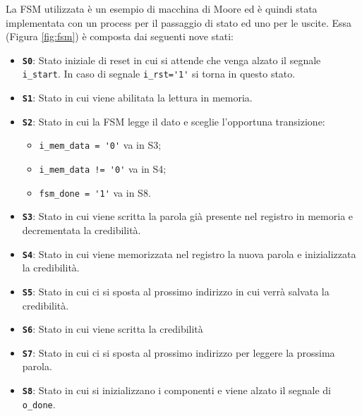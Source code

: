 La FSM utilizzata è un esempio di macchina di Moore ed è quindi stata implementata con un process per il passaggio di stato ed uno per le uscite.
Essa (Figura \ref{fig:fsm}) è composta dai seguenti nove stati:

\begin{itemize}[itemsep=10pt]
	\item \texttt{\textbf{S0}}:\newline
	Stato iniziale di reset in cui si attende che venga alzato il segnale \lstinline[columns=fixed]{i_start}. In caso di segnale \lstinline[columns=fixed]{i_rst='1'} si torna in questo stato.
 	\item \texttt{\textbf{S1}}:\newline
	Stato in cui viene abilitata la lettura in memoria.
 	\item \texttt{\textbf{S2}}:\newline
	Stato in cui la FSM legge il dato e sceglie l'opportuna transizione:
        \begin{itemize}
        	\item \lstinline[columns=fixed]{i_mem_data = '0'} va in S3;
        	\item \lstinline[columns=fixed]{i_mem_data != '0'} va in S4;
        	\item \lstinline[columns=fixed]{fsm_done = '1'} va in S8.
        \end{itemize}
 	\item \texttt{\textbf{S3}}:\newline
	Stato in cui viene scritta la parola già presente nel registro in memoria e decrementata la credibilità.
 	\item \texttt{\textbf{S4}}:\newline
	Stato in cui viene memorizzata nel registro la nuova parola e inizializzata la credibilità.
 	\item \texttt{\textbf{S5}}:\newline
	Stato in cui ci si sposta al prossimo indirizzo in cui verrà salvata la credibilità.
 	\item \texttt{\textbf{S6}}:\newline
	Stato in cui viene scritta la credibilità
	\item \texttt{\textbf{S7}}:\newline
	Stato in cui ci si sposta al prossimo indirizzo per leggere la prossima parola.
 	\item \texttt{\textbf{S8}}:\newline
	Stato in cui si inizializzano i componenti e viene alzato il segnale di \lstinline[columns=fixed]{o_done}.
\end{itemize}

